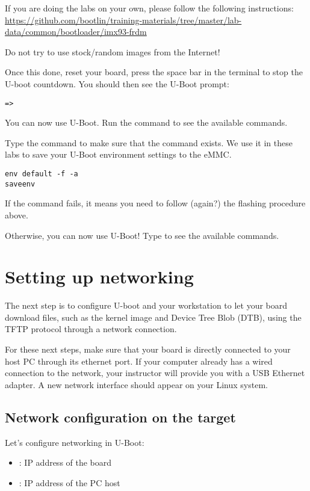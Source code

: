 If you are doing the labs on your own, please follow the following instructions:
\url{https://github.com/bootlin/training-materials/tree/master/lab-data/common/bootloader/imx93-frdm}

Do not try to use stock/random images from the Internet!

Once this done, reset your board, press the space bar in the
 terminal to stop the U-boot countdown. You should then see the
U-Boot prompt:

\begin{verbatim}
=>
\end{verbatim}

You can now use U-Boot. Run the  command to see the available
commands.

Type the  command to make sure that the
 command exists. We use it in these labs to
save your U-Boot environment settings to the eMMC.

\begin{verbatim}
env default -f -a
saveenv
\end{verbatim}

If the  command fails, it means you need to follow
(again?) the flashing procedure above.

Otherwise, you can now use U-Boot! Type  to see the available
commands.

\section{Setting up networking}

The next step is to configure U-boot and your workstation to let your
board download files, such as the kernel image and Device Tree Blob
(DTB), using the TFTP protocol through a network connection.

For these next steps, make sure that your board is directly connected
to your host PC through its ethernet port. If your computer already has a wired
connection to the network, your instructor will provide you with a USB Ethernet
adapter. A new network interface should appear on your Linux system.

\subsection{Network configuration on the target}

Let's configure networking in U-Boot:

\begin{itemize}
\item {}: IP address of the board
\item {}: IP address of the PC host
\end{itemize}

